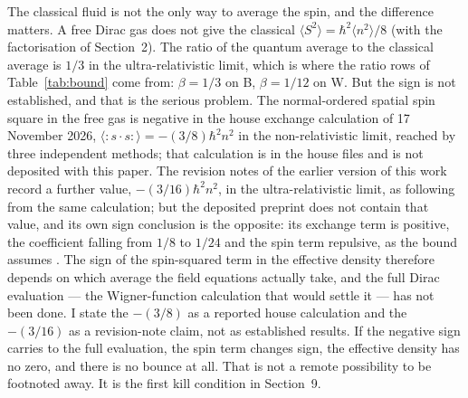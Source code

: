 \documentclass[11pt]{article}
\begin{document}
The classical fluid is not the only way to average the spin, and the
difference matters. A free Dirac gas does not give the classical
$\langle S^2\rangle = \hbar^2\langle n^2\rangle/8$ (with the
factorisation of Section~2). The ratio of the quantum average
to the classical average is $1/3$ in the ultra-relativistic limit, which
is where the ratio rows of Table~\ref{tab:bound} come from: $\beta =
1/3$ on B, $\beta = 1/12$ on W. But the sign is not established, and
that is the serious problem. The normal-ordered spatial spin square in
the free gas is negative in the house exchange calculation of 17 November
2026, $\langle{:}s\cdot s{:}\rangle = -(3/8)\hbar^2 n^2$ in the
non-relativistic limit, reached by three independent methods; that
calculation is in the house files and is not deposited with this paper.
The revision notes of the earlier version of this work record a further
value, $-(3/16)\hbar^2 n^2$, in the ultra-relativistic limit, as
following from the same calculation; but the deposited preprint does not
contain that value, and its own sign conclusion is the opposite: its
exchange term is positive, the coefficient falling from $1/8$ to $1/24$
and the spin term repulsive, as the bound assumes \cite{Aldred26}. The
sign of the spin-squared term in the effective density therefore depends
on which average the field equations actually take, and the full Dirac
evaluation --- the Wigner-function calculation that would settle it ---
has not been done. I state the $-(3/8)$ as a reported house calculation
and the $-(3/16)$ as a revision-note claim, not as established results. If the negative sign carries to
the full evaluation, the spin term changes sign, the effective density
has no zero, and there is no bounce at all. That is not a remote
possibility to be footnoted away. It is the first kill condition in
Section~9.
\end{document}
